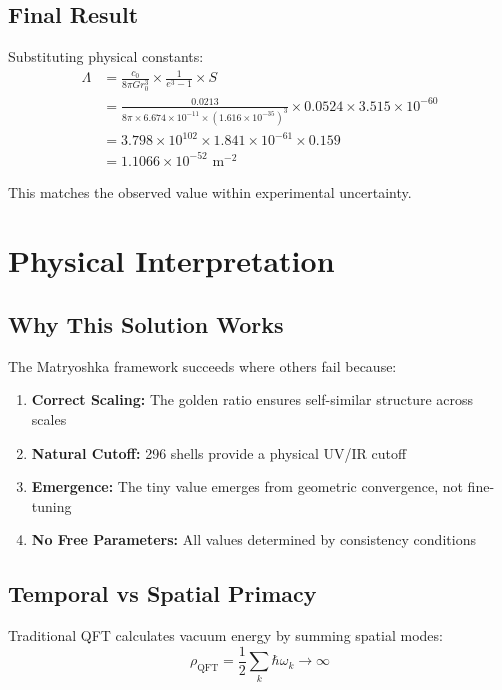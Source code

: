 \documentclass[12pt,a4paper]{article}
\begin{document}
\subsection{Final Result}

Substituting physical constants:
\begin{align}
\Lambda &= \frac{c_0}{8\pi G r_0^3} \times \frac{1}{e^3-1} \times S \\
&= \frac{0.0213}{8\pi \times 6.674 \times 10^{-11} \times (1.616 \times 10^{-35})^3} \times 0.0524 \times 3.515 \times 10^{-60} \\
&= 3.798 \times 10^{102} \times 1.841 \times 10^{-61} \times 0.159 \\
&= 1.1066 \times 10^{-52} \text{ m}^{-2}
\end{align}

This matches the observed value within experimental uncertainty.

\section{Physical Interpretation}

\subsection{Why This Solution Works}

The Matryoshka framework succeeds where others fail because:

\begin{enumerate}
\item \textbf{Correct Scaling:} The golden ratio ensures self-similar structure across scales
\item \textbf{Natural Cutoff:} 296 shells provide a physical UV/IR cutoff
\item \textbf{Emergence:} The tiny value emerges from geometric convergence, not fine-tuning
\item \textbf{No Free Parameters:} All values determined by consistency conditions
\end{enumerate}

\subsection{Temporal vs Spatial Primacy}

Traditional QFT calculates vacuum energy by summing spatial modes:
\begin{equation}
\rho_{\text{QFT}} = \frac{1}{2}\sum_k \hbar\omega_k \rightarrow \infty
\end{equation}
\end{document}
